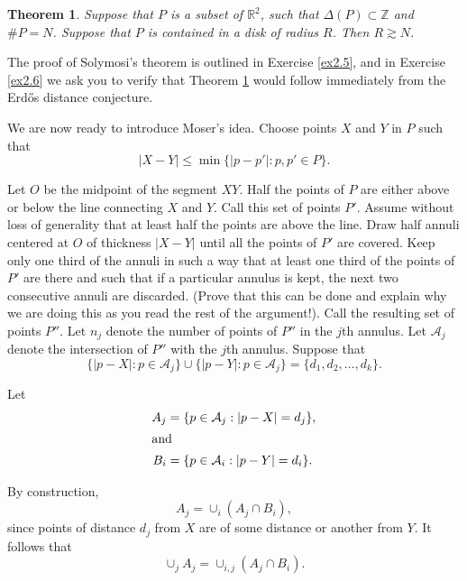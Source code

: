 \documentclass[]{amsart}
\numberwithin{equation}{section}
\theoremstyle{plain}
\newtheorem{theorem}{Theorem}[section]
\theoremstyle{definition}
\theoremstyle{remark}
\begin{document}
\begin{theorem} \label{soly.thm}
Suppose that $P$ is a subset of $\mathbb{R}^2$, such that $\Delta(P)
\subset \mathbb{Z}$ and $\# P=N$. Suppose that $P$ is contained in a
disk of radius $R$. Then $R \gtrsim N$. \end{theorem}

The proof of Solymosi's theorem is outlined in Exercise \ref{ex2.5}, and
in Exercise \ref{ex2.6} we ask you to verify that Theorem \ref{soly.thm} would follow
immediately from the Erd\H{o}s distance conjecture.

We are now ready to introduce Moser's idea. Choose points $X$ and
$Y$ in $P$ such that
\begin{equation}
|X-Y| \leq \min \{|p-p'|: p,p' \in P\}.
\end{equation}


Let $O$ be the midpoint of the segment $XY$. Half the points of
$P$ are either above or below the line connecting $X$ and $Y$.
Call this set of points $P'$. Assume without loss of generality
that at least half the points are above the line. Draw half annuli
centered at $O$ of thickness $|X-Y|$ until all the points of $P'$
are covered. Keep only one third of the annuli in such a way that
at least one third of the points of $P'$ are there and such that
if a particular annulus is kept, the next two consecutive annuli
are discarded. (Prove that this can be done and explain why we are
doing this as you read the rest of the argument!). Call the
resulting set of points $P''$. Let $n_j$ denote the number of
points of $P''$ in the $j$th annulus. Let $\mathcal{A}_j$ denote the
intersection of $P''$ with the $j$th annulus. Suppose that
\begin{equation}
\{|p-X|: p \in \mathcal{A}_j\} \cup \{|p-Y|: p \in
\mathcal{A}_j\}=\{d_1,d_2, \dots, d_k\}.
\end{equation}


Let
\begin{align}
A_j&=\{p \in \mathcal{A}_j: |p-X|=d_j\}, \\ \intertext{and}
 B_i&=\{p \in \mathcal{A}_i: |p-Y|=d_i\}.
\end{align}


By construction,
\begin{equation}
A_j=\cup_i \left( A_j \cap B_i \right),
\end{equation}
 since
points of distance $d_j$ from $X$ are of some distance or another
from $Y$.  It follows that
\begin{equation}
\cup_j A_j=\cup_{i,j} \left( A_j \cap B_i \right).
\end{equation}
\end{document}
